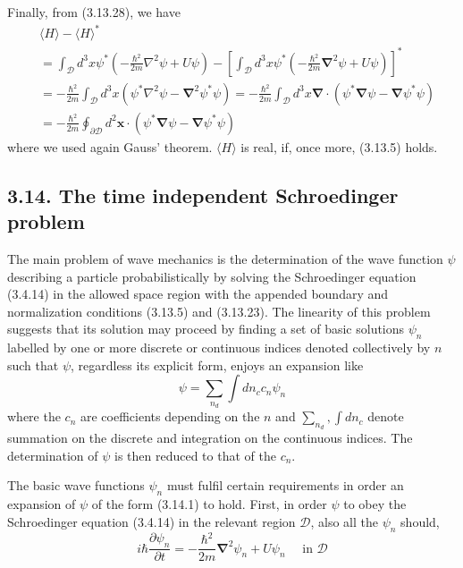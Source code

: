 \documentclass{article}
\begin{document}
Finally, from (3.13.28), we have
$$
\begin{align*}
& \langle H\rangle-\langle H\rangle^{*}  \tag{3.13.32}\\
& =\int_{\mathcal{D}} d^{3} x \psi^{*}\left(-\frac{\hbar^{2}}{2 m} \nabla^{2} \psi+U \psi\right)-\left[\int_{\mathcal{D}} d^{3} x \psi^{*}\left(-\frac{\hbar^{2}}{2 m} \boldsymbol{\nabla}^{2} \psi+U \psi\right)\right]^{*} \\
& =-\frac{\hbar^{2}}{2 m} \int_{\mathcal{D}} d^{3} x\left(\psi^{*} \nabla^{2} \psi-\boldsymbol{\nabla}^{2} \psi^{*} \psi\right)=-\frac{\hbar^{2}}{2 m} \int_{\mathcal{D}} d^{3} x \boldsymbol{\nabla} \cdot\left(\psi^{*} \boldsymbol{\nabla} \psi-\boldsymbol{\nabla} \psi^{*} \psi\right) \\
& =-\frac{\hbar^{2}}{2 m} \oint_{\partial \mathcal{D}} d^{2} \boldsymbol{x} \cdot\left(\psi^{*} \boldsymbol{\nabla} \psi-\boldsymbol{\nabla} \psi^{*} \psi\right)
\end{align*}
$$
where we used again Gauss' theorem. $\langle H\rangle$ is real, if, once more, (3.13.5) holds.

\subsection*{3.14. The time independent Schroedinger problem}

The main problem of wave mechanics is the determination of the wave function $\psi$ describing a particle probabilistically by solving the Schroedinger equation (3.4.14) in the allowed space region with the appended boundary and normalization conditions (3.13.5) and (3.13.23). The linearity of this problem suggests that its solution may proceed by finding a set of basic solutions $\psi_{n}$ labelled by one or more discrete or continuous indices denoted collectively by $n$ such that $\psi$, regardless its explicit form, enjoys an expansion like
$$
\begin{equation*}
\psi=\sum_{n_{d}} \int d n_{c} c_{n} \psi_{n} \tag{3.14.1}
\end{equation*}
$$
where the $c_{n}$ are coefficients depending on the $n$ and $\sum_{n_{d}}, \int d n_{c}$ denote summation on the discrete and integration on the continuous indices. The determination of $\psi$ is then reduced to that of the $c_{n}$.

The basic wave functions $\psi_{n}$ must fulfil certain requirements in order an expansion of $\psi$ of the form (3.14.1) to hold. First, in order $\psi$ to obey the Schroedinger equation (3.4.14) in the relevant region $\mathcal{D}$, also all the $\psi_{n}$ should,
$$
\begin{equation*}
i \hbar \frac{\partial \psi_{n}}{\partial t}=-\frac{\hbar^{2}}{2 m} \boldsymbol{\nabla}^{2} \psi_{n}+U \psi_{n} \quad \text { in } \mathcal{D} \tag{3.14.2}
\end{equation*}
$$
\end{document}
